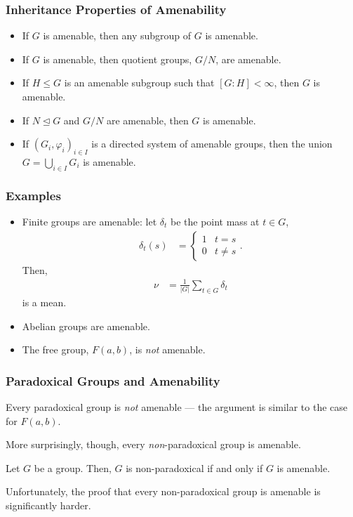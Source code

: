\documentclass{beamer-custom}
\begin{document}
\begin{frame}
  \frametitle{Inheritance Properties of Amenability}
  \begin{itemize}
    \item If $G$ is amenable, then any subgroup of $G$ is amenable.\pause
    \item If $G$ is amenable, then quotient groups, $G/N$, are amenable.\pause
    \item If $H\leq G$ is an amenable subgroup such that $\left[ G:H \right] < \infty$, then $G$ is amenable.\pause
    \item If $N\trianglelefteq G$ and $G/N$ are amenable, then $G$ is amenable.\pause
    \item If $\left( G_i,\varphi_i \right)_{i\in I}$ is a directed system of amenable groups, then the union $G = \bigcup_{i\in I}G_i$ is amenable.
  \end{itemize}
\end{frame}
\begin{frame}
  \frametitle{Examples}
  \begin{itemize}
    \item Finite groups are amenable: let $\delta_t$ be the point mass at $t\in G$,
      \begin{align*}
        \delta_t(s) &= \begin{cases}
          1 & t = s\\
          0 & t\neq s
        \end{cases}.
      \end{align*}
      Then,
      \begin{align*}
        \nu &= \frac{1}{\left\vert G \right\vert} \sum_{t\in G}\delta_t
      \end{align*}
      is a mean.
    \item Abelian groups are amenable.
    \item The free group, $F(a,b)$, is \textit{not} amenable.
  \end{itemize}
\end{frame}
\begin{frame}
  \frametitle{Paradoxical Groups and Amenability}
  Every paradoxical group is \textit{not} amenable --- the argument is similar to the case for $F(a,b)$.\pause\newline

  More surprisingly, though, every \textit{non}-paradoxical group is amenable.\pause
  \begin{theorem}
    Let $G$ be a group. Then, $G$ is non-paradoxical if and only if $G$ is amenable.
  \end{theorem}\pause
  Unfortunately, the proof that every non-paradoxical group is amenable is significantly harder.
\end{frame}
\end{document}
